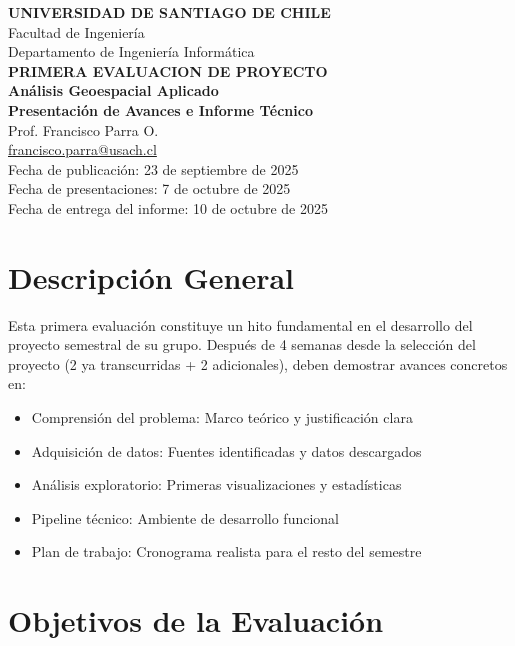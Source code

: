 \documentclass[11pt,a4paper]{article}
\begin{document}
\thispagestyle{plain}

\begin{center}
\textbf{UNIVERSIDAD DE SANTIAGO DE CHILE}\\
Facultad de Ingeniería\\
Departamento de Ingeniería Informática\\[10pt]

\textbf{\Large PRIMERA EVALUACION DE PROYECTO}\\[6pt]
\textbf{\large Análisis Geoespacial Aplicado}\\
\textbf{\large Presentación de Avances e Informe Técnico}\\[10pt]

Prof. Francisco Parra O.\\
\href{mailto:francisco.parra@usach.cl}{francisco.parra@usach.cl}\\[8pt]

Fecha de publicación: 23 de septiembre de 2025\\
Fecha de presentaciones: 7 de octubre de 2025\\
Fecha de entrega del informe: 10 de octubre de 2025
\end{center}

\section{Descripción General}
Esta primera evaluación constituye un hito fundamental en el desarrollo del proyecto semestral de su grupo. Después de 4 semanas desde la selección del proyecto (2 ya transcurridas + 2 adicionales), deben demostrar avances concretos en:

\begin{itemize}[leftmargin=1.2cm]
  \item Comprensión del problema: Marco teórico y justificación clara
  \item Adquisición de datos: Fuentes identificadas y datos descargados
  \item Análisis exploratorio: Primeras visualizaciones y estadísticas
  \item Pipeline técnico: Ambiente de desarrollo funcional
  \item Plan de trabajo: Cronograma realista para el resto del semestre
\end{itemize}

\section{Objetivos de la Evaluación}
\end{document}
